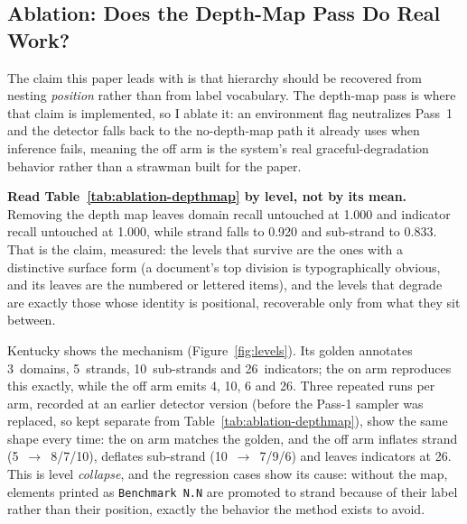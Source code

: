 \subsection{Ablation: Does the Depth-Map Pass Do Real Work?}
\label{sec:experiments-ablation}

The claim this paper leads with is that hierarchy should be recovered from
nesting \emph{position} rather than from label vocabulary. The depth-map pass is
where that claim is implemented, so I ablate it: an environment flag
neutralizes Pass~1 and the detector falls back to the no-depth-map path it
already uses when inference fails, meaning the off arm is the system's real
graceful-degradation behavior rather than a strawman built for the paper.



\textbf{Read Table~\ref{tab:ablation-depthmap} by level, not by its mean.} Removing the
depth map leaves domain recall untouched at 1.000 and indicator recall untouched
at 1.000, while strand falls to 0.920 and sub-strand to 0.833. That is the
claim, measured: the levels that survive are the ones with a distinctive
surface form (a document's top division is typographically obvious, and its
leaves are the numbered or lettered items), and the levels that degrade are
exactly those whose identity is positional, recoverable only from what they sit
between.



Kentucky shows the mechanism (Figure~\ref{fig:levels}). Its golden annotates
3~domains, 5~strands, 10~sub-strands and 26~indicators; the on arm reproduces
this exactly, while the off arm emits 4, 10, 6 and 26. Three repeated runs per
arm, recorded at an earlier detector version (before the Pass-1 sampler was
replaced, so kept separate from Table~\ref{tab:ablation-depthmap}), show the
same shape every time: the on arm matches the golden, and the off arm inflates
strand (5~$\rightarrow$~8/7/10), deflates sub-strand (10~$\rightarrow$~7/9/6)
and leaves indicators at 26. This is level \emph{collapse}, and the regression
cases show its cause: without the map, elements printed as
\texttt{Benchmark N.N} are promoted to strand because of their label rather
than their position, exactly the behavior the method exists to avoid.

